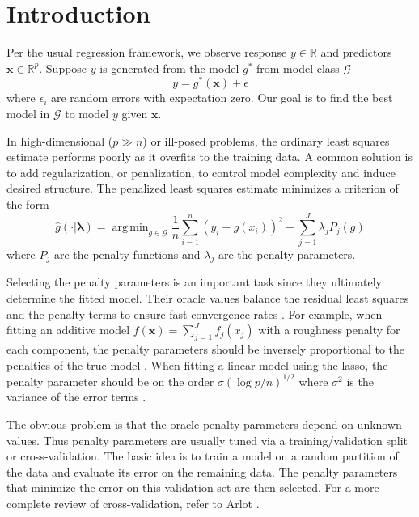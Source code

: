 \documentclass[12pt]{article}
\DeclareMathOperator*{\argmin}{arg\,min}
\begin{document}
\section{Introduction}

Per the usual regression framework, we observe response $y \in \mathbb{R}$ and predictors $\boldsymbol {x} \in \mathbb{R}^p$. Suppose $y$ is generated from the model $g^*$ from model class $\mathcal{G}$
\begin{equation}
y = g^*(\boldsymbol x) + \epsilon
\end{equation}
where $\epsilon_i$ are random errors with expectation zero. Our goal is to find the best model in $\mathcal{G}$ to model $y$ given $\boldsymbol x$.

In high-dimensional ($p \gg n$) or ill-posed problems, the ordinary least squares estimate performs poorly as it overfits to the training data. A common solution is to add regularization, or penalization, to control model complexity and induce desired structure. The penalized least squares estimate minimizes a criterion of the form
\begin{equation}
\label{intro_train_criterion}
\hat{g}(\cdot | \boldsymbol \lambda) = \argmin_{g\in \mathcal{G}} \frac{1}{n} \sum_{i=1}^n \left (y_i -  g(x_i) \right )^2 + \sum_{j=1}^J \lambda_j P_j(g)
\end{equation}
where $P_j$ are the penalty functions and $\lambda_j$ are the penalty parameters.

Selecting the penalty parameters is an important task since they ultimately determine the fitted model. Their oracle values balance the residual least squares and the penalty terms to ensure fast convergence rates \citep{van2000empirical}. For example, when fitting an additive model $f(\boldsymbol x) = \sum_{j=1}^J f_j(x_j)$ with a roughness penalty for each component, the penalty parameters should be inversely proportional to the penalties of the true model \citep{van2014additive}. When fitting a linear model using the lasso, the penalty parameter should be on the order $\sigma (\log p /n )^{1/2}$ where $\sigma^2$ is the variance of the error terms \citep{buhlmann2011statistics}.

The obvious problem is that the oracle penalty parameters depend on unknown values. Thus penalty parameters are usually tuned via a training/validation split or cross-validation. The basic idea is to train a model on a random partition of the data and evaluate its error on the remaining data. The penalty parameters that minimize the error on this validation set are then selected. For a more complete review of cross-validation, refer to Arlot \citep{arlot2010survey}.
\end{document}
